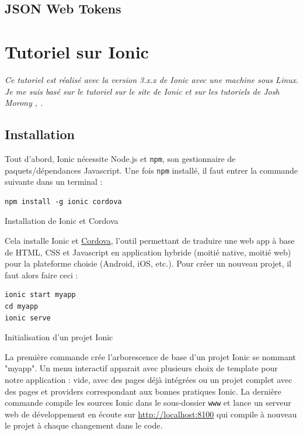 \documentclass[a4paper, 12pt]{article}
\newenvironment{code}{\captionsetup{type=listing}}{}
\begin{document}
\subsection{JSON Web Tokens}


\section{Tutoriel sur Ionic}
\label{tuto_ionic}
\textit{Ce tutoriel est réalisé avec la version 3.x.x de Ionic avec une machine sous Linux. Je me suis basé sur  
le tutoriel sur le site de Ionic \cite{ref0} et sur les tutoriels de Josh Morony \cite{ref10}, \cite{ref20}.}
\subsection{Installation}
Tout d'abord, Ionic nécessite Node.js et \texttt{npm}, son gestionnaire de paquets/dépendances Javascript. 
Une fois \texttt{npm} installé, il faut entrer la commande suivante dans un terminal :
\begin{code}
    \begin{verbatim}
npm install -g ionic cordova
    \end{verbatim}
    \caption{Installation de Ionic et Cordova}
    \label{install_ionic_cordova}
\end{code}
Cela installe Ionic et \href{https://cordova.apache.org}{Cordova}, l'outil permettant de traduire une web app à base de 
HTML, CSS et Javascript en application hybride (moitié native, moitié web) pour la plateforme choisie (Android, iOS, etc.). 
Pour créer un nouveau projet, il faut alors faire ceci :
\begin{code}
    \begin{verbatim}
ionic start myapp
cd myapp
ionic serve
    \end{verbatim}
    \caption{Initialisation d'un projet Ionic}
\end{code}
La première commande crée l'arborescence de base d'un projet Ionic se nommant "myapp". Un menu interactif apparait avec 
plusieurs choix de template pour notre application : vide, avec des pages déjà intégrées ou un projet complet avec des pages 
et providers correspondant aux bonnes pratiques Ionic.
La dernière commande compile les sources Ionic dans le sous-dossier \texttt{www}
et lance un serveur web de développement en écoute sur \url{http://localhost:8100} qui compile à nouveau le projet à chaque 
changement dans le code.
\end{document}
